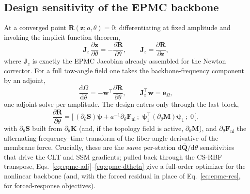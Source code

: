 \documentclass[11pt]{article}
\newcommand{\dd}{\mathrm{d}}
\begin{document}
\subsection{Design sensitivity of the EPMC backbone}
At a converged point $\bm R(\bm z;a,\theta)=0$; differentiating at fixed amplitude
and invoking the implicit function theorem,
\begin{equation}
\bm J_z\,\frac{\partial\bm z}{\partial\theta}=-\frac{\partial\bm R}{\partial\theta},
\qquad \bm J_z=\frac{\partial\bm R}{\partial\bm z},
\label{eq:epmc-ift}
\end{equation}
where $\bm J_z$ is exactly the EPMC Jacobian already assembled for the Newton
corrector. For a full tow-angle field one takes the backbone-frequency component
by an adjoint,
\begin{equation}
\frac{\dd\Omega}{\dd\theta}=-\bm w^{\!\top}\frac{\partial\bm R}{\partial\theta},
\qquad \bm J_z^{\!\top}\bm w=\bm e_\Omega ,
\label{eq:epmc-adj}
\end{equation}
one adjoint solve per amplitude. The design enters only through the last block,
\begin{equation}
\frac{\partial\bm R}{\partial\theta}=
\Big[\,(\partial_\theta\bm S)\bm\psi+a^{-1}\partial_\theta\bm F_{\mathrm{nl}}\,;\;
\bm\psi_1^{\!\top}(\partial_\theta\bm M)\bm\psi_1\,;\;0\,\Big],
\label{eq:epmc-dtheta}
\end{equation}
with $\partial_\theta\bm S$ built from $\partial_\theta\bm K$ (and, if the topology
field is active, $\partial_\theta\bm M$), and $\partial_\theta\bm F_{\mathrm{nl}}$ the
alternating-frequency--time transform of the fiber-angle derivative of the membrane
force. Crucially, these are the \emph{same} per-station $\dd\bar{\bm Q}/\dd\theta$
sensitivities that drive the CLT and SSM gradients; pulled back through the CS-RBF
transpose, Eqs.~\eqref{eq:epmc-adj}--\eqref{eq:epmc-dtheta} give a full-order
optimizer for the nonlinear backbone (and, with the forced residual in place of
Eq.~\eqref{eq:epmc-res}, for forced-response objectives).
\end{document}
